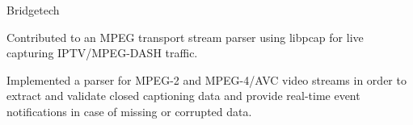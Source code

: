 \begin{experience}{Bridgetech}{}
    \item{Contributed to an MPEG transport stream parser using libpcap for live capturing IPTV/MPEG-DASH traffic.}
    \item{Implemented a parser for MPEG-2 and MPEG-4/AVC video streams in order to extract and validate closed captioning data and provide real-time event notifications in case of missing or corrupted data.}
\end{experience}





